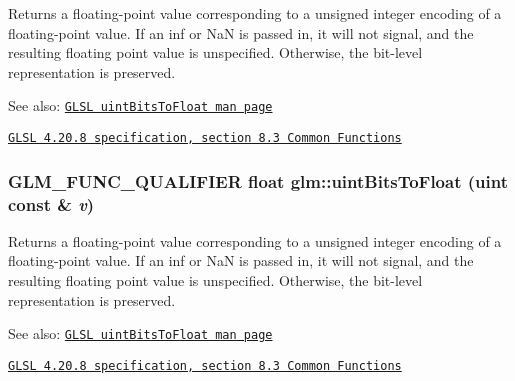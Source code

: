 Returns a floating-point value corresponding to a unsigned integer encoding of a floating-point value. If an inf or NaN is passed in, it will not signal, and the resulting floating point value is unspecified. Otherwise, the bit-level representation is preserved.

\begin{Desc}
\item[See also:]\href{http://www.opengl.org/sdk/docs/manglsl/xhtml/uintBitsToFloat.xml}{\tt GLSL uintBitsToFloat man page} 

\href{http://www.opengl.org/registry/doc/GLSLangSpec.4.20.8.pdf}{\tt GLSL 4.20.8 specification, section 8.3 Common Functions} \end{Desc}
\hypertarget{group__core__func__common_g97464ca9ff4267de30ea408f700d4ca8}{
\subsubsection[uintBitsToFloat]{\setlength{\rightskip}{0pt plus 5cm}GLM\_\-FUNC\_\-QUALIFIER float glm::uintBitsToFloat (uint const \& {\em v})}}
\label{group__core__func__common_g97464ca9ff4267de30ea408f700d4ca8}


Returns a floating-point value corresponding to a unsigned integer encoding of a floating-point value. If an inf or NaN is passed in, it will not signal, and the resulting floating point value is unspecified. Otherwise, the bit-level representation is preserved.

\begin{Desc}
\item[See also:]\href{http://www.opengl.org/sdk/docs/manglsl/xhtml/uintBitsToFloat.xml}{\tt GLSL uintBitsToFloat man page} 

\href{http://www.opengl.org/registry/doc/GLSLangSpec.4.20.8.pdf}{\tt GLSL 4.20.8 specification, section 8.3 Common Functions} \end{Desc}
